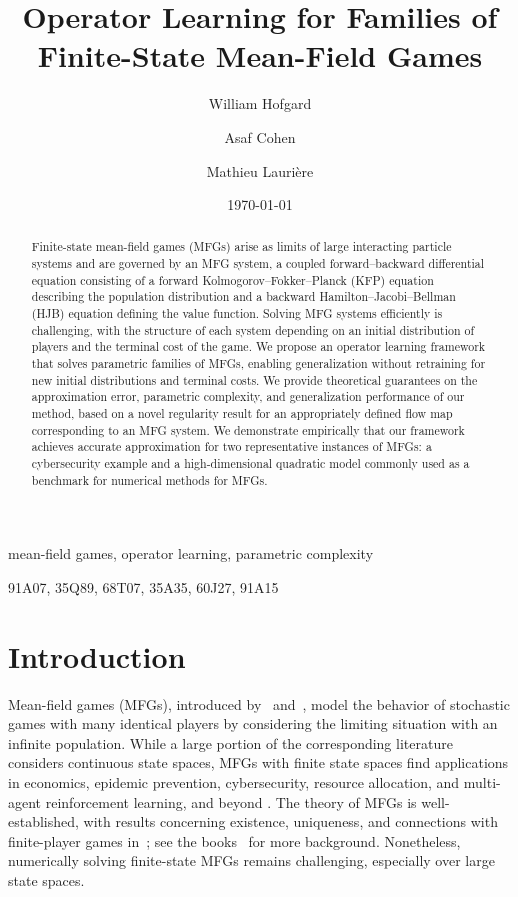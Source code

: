 \documentclass[11pt,reqno]{amsart}
\title{Operator Learning for Families of Finite-State Mean-Field Games}
\author{William Hofgard}
\author{Asaf Cohen}
\author{Mathieu Lauri\`ere}
\date{\today}
\numberwithin{equation}{section}
\theoremstyle{plain}
\newcommand{\1}{\boldsymbol{\mathbbm{1}}}
\begin{document}
\maketitle
\begin{abstract}
Finite-state mean-field games (MFGs) arise as limits of large interacting particle systems and are governed by an MFG system, a coupled forward–backward differential equation consisting of a forward Kolmogorov--Fokker--Planck (KFP) equation describing the population distribution and a backward Hamilton--Jacobi--Bellman (HJB) equation defining the value function. Solving MFG systems efficiently is challenging, with the structure of each system depending on an initial distribution of players and the terminal cost of the game. We propose an operator learning framework that solves parametric families of MFGs, enabling generalization without retraining for new initial distributions and terminal costs. We provide theoretical guarantees on the approximation error, parametric complexity, and generalization performance of our method, based on a novel regularity result for an appropriately defined flow map corresponding to an MFG system. We demonstrate empirically that our framework achieves accurate approximation for two representative instances of MFGs: a cybersecurity example and a high-dimensional quadratic model commonly used as a benchmark for numerical methods for MFGs.
\end{abstract}
 mean-field games, operator learning, parametric complexity

91A07,
35Q89,
68T07,
35A35,
60J27,
91A15

\tableofcontents
\section{Introduction}
\label{sec:intro}
Mean-field games (MFGs), introduced by~\cite{Huang2006} and~\cite{LasryLions}, model the behavior of stochastic games with many identical players by considering the limiting situation with an infinite population. While a large portion of the corresponding literature considers continuous state spaces, MFGs with finite state spaces find applications in economics, epidemic prevention, cybersecurity, resource allocation, and multi-agent reinforcement learning, and beyond \citep{gomes2014socio,MR3575619,MR4413053,mao2022mean,mfgs-marl}. The theory of MFGs is well-established, with results concerning existence, uniqueness, and connections with finite-player games in~\cite{Gomes2013,bay-coh2019, cec-pel2019}; see the books~\cite{CarmonaDelarue_book_I, CarmonaDelarue_book_II} for more background. Nonetheless, numerically solving finite-state MFGs remains challenging, especially over large state spaces. 
\end{document}
